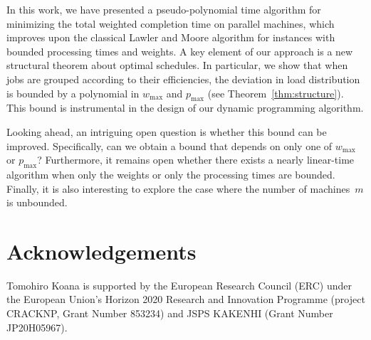 \documentclass[11pt]{llncs}
\begin{document}
In this work, we have presented a pseudo-polynomial time algorithm for minimizing the total weighted completion time on parallel machines, which improves upon the classical Lawler and Moore algorithm for instances with bounded processing times and weights.
A key element of our approach is a new structural theorem about optimal schedules. In particular, we show that when jobs are grouped according to their efficiencies, the deviation in load distribution is bounded by a polynomial in $w_{\max}$ and $p_{\max}$ (see Theorem~\ref{thm:structure}). This bound is instrumental in the design of our dynamic programming algorithm.

Looking ahead, an intriguing open question is whether this bound can be improved. Specifically, can we obtain a bound that depends on only one of $w_{\max}$ or $p_{\max}$? Furthermore, it remains open whether there exists a nearly linear-time algorithm when only the weights or only the processing times are bounded. Finally, it is also interesting to explore the case where the number of machines~$m$ is unbounded.

\section*{Acknowledgements}
Tomohiro Koana is supported by the European Research Council (ERC) under the European Union’s
Horizon 2020 Research and Innovation Programme (project CRACKNP, Grant Number 853234) and JSPS KAKENHI (Grant Number JP20H05967).



\end{document}
